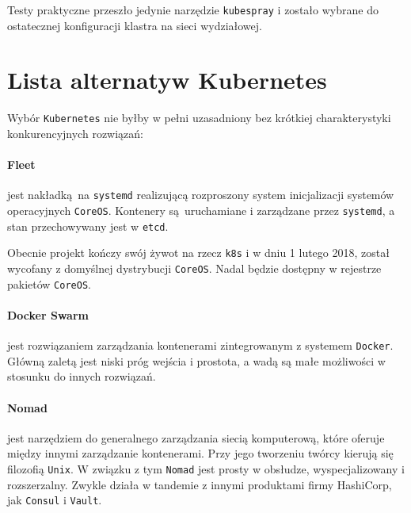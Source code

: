 \documentclass[a4paper,12pt,twoside,openany]{report}
\newcommand{\passthrough}[1]{#1}
\begin{document}
Testy praktyczne przeszło jedynie narzędzie
\passthrough{\lstinline!kubespray!} i zostało wybrane do ostatecznej
konfiguracji klastra na sieci wydziałowej.

\hypertarget{lista-alternatyw-kubernetes}{%
\section{Lista alternatyw
Kubernetes}\label{lista-alternatyw-kubernetes}}

Wybór \passthrough{\lstinline!Kubernetes!} nie byłby w pełni uzasadniony
bez krótkiej charakterystyki konkurencyjnych rozwiązań:

\hypertarget{fleet}{%
\paragraph{Fleet}\label{fleet}}

jest nakładką~na \passthrough{\lstinline!systemd!} realizującą
rozproszony system inicjalizacji systemów operacyjnych
\passthrough{\lstinline!CoreOS!}. Kontenery są~uruchamiane i zarządzane
przez \passthrough{\lstinline!systemd!}, a stan przechowywany jest w
\passthrough{\lstinline!etcd!}.

Obecnie projekt kończy swój żywot na rzecz \passthrough{\lstinline!k8s!}
i w dniu 1 lutego 2018, został wycofany z domyślnej dystrybucji
\passthrough{\lstinline!CoreOS!}. Nadal będzie dostępny w rejestrze
pakietów \passthrough{\lstinline!CoreOS!}.

\hypertarget{docker-swarm}{%
\paragraph{Docker Swarm}\label{docker-swarm}}

jest rozwiązaniem zarządzania kontenerami zintegrowanym z systemem
\passthrough{\lstinline!Docker!}. Główną zaletą jest niski próg wejścia
i prostota, a wadą są małe możliwości w stosunku do innych rozwiązań.

\hypertarget{nomad}{%
\paragraph{Nomad}\label{nomad}}

jest narzędziem do generalnego zarządzania siecią komputerową, które
oferuje między innymi zarządzanie kontenerami. Przy jego tworzeniu
twórcy kierują się filozofią \passthrough{\lstinline!Unix!}. W związku z
tym \passthrough{\lstinline!Nomad!} jest prosty w obsłudze,
wyspecjalizowany i rozszerzalny. Zwykle działa w tandemie z innymi
produktami firmy HashiCorp, jak \passthrough{\lstinline!Consul!} i
\passthrough{\lstinline!Vault!}.
\end{document}
